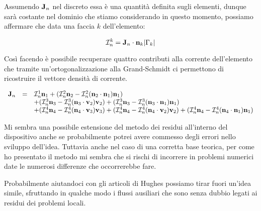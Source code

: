 Assumendo $\mathbf{J}_n$ nel discreto essa \`e una quantit\`a definita sugli elementi, dunque sar\`a costante nel dominio che stiamo considerando in questo momento, possiamo affermare che data una faccia $k$ dell'elemento:

\begin{equation}
\mathcal{I}_n^k = \mathbf{J}_n \cdot \mathbf{n}_k |\Gamma_k|
\end{equation}

Cos\`i facendo \`e possibile recuperare quattro contributi alla corrente dell'elemento che tramite un'ortogonalizzazione alla Grand-Schmidt ci permettono di ricostruire il vettore densit\`a di corrente.

\begin{equation*}
\begin{array}{rcl}
\mathbf{J}_n  & = & \mathcal{I}_n^1 \mathbf{n}_1 
+ (\mathcal{I}_n^2 \mathbf{n}_2 - \mathcal{I}_n^2 (\mathbf{n}_2 \cdot \mathbf{n}_1) \mathbf{n}_1) \\
& & + (\mathcal{I}_n^3 \mathbf{n}_3 - \mathcal{I}_n^3 (\mathbf{n}_3 \cdot \mathbf{v}_2) \mathbf{v}_2 )
+ (\mathcal{I}_n^3 \mathbf{n}_3 - \mathcal{I}_n^3 (\mathbf{n}_3 \cdot \mathbf{n}_1) \mathbf{n}_1) \\
& & + (\mathcal{I}_n^4 \mathbf{n}_4 - \mathcal{I}_n^4 (\mathbf{n}_4 \cdot \mathbf{v}_3) \mathbf{v}_3 )
+ (\mathcal{I}_n^4 \mathbf{n}_4 - \mathcal{I}_n^4 (\mathbf{n}_4 \cdot \mathbf{v}_2) \mathbf{v}_2 )
+ (\mathcal{I}_n^4 \mathbf{n}_4 - \mathcal{I}_n^4 (\mathbf{n}_4 \cdot \mathbf{n}_1) \mathbf{n}_1)
\end{array}
\end{equation*}

Mi sembra una possibile estensione del metodo dei residui all'interno del dispositivo anche se probabilmente potrei avere commesso degli errori nello sviluppo dell'idea. Tuttavia anche nel caso di una corretta base teorica, per come ho presentato il metodo mi sembra che si rischi di incorrere in problemi numerici date le numerosi differenze che occorrerebbe fare.

Probabilmente aiutandoci con gli articoli di Hughes possiamo tirar fuori un'idea simile, sfruttando in qualche modo i flussi ausiliari che sono senza dubbio legati ai residui dei problemi locali.

